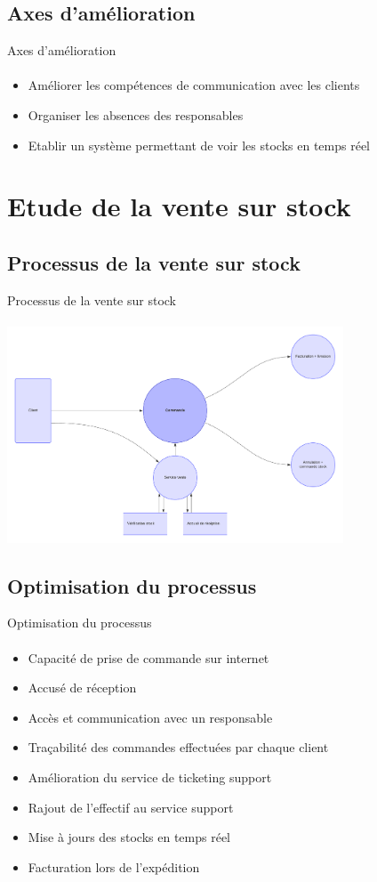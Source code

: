 \documentclass{beamer}
\begin{document}
    \subsection{Axes d'amélioration}
    \begin{frame}[label=lists]{Axes d'amélioration}
      \framesubtitle{}
      \begin{itemize}
      	\item Améliorer les compétences de communication avec les clients
      	\item Organiser les absences des responsables
      	\item Etablir un système permettant de voir les stocks en temps réel
      \end{itemize}
    \end{frame}

	\section{Etude de la vente sur stock}
	\subsection{Processus de la vente sur stock}
    \begin{frame}[label=lists]{Processus de la vente sur stock}
      \framesubtitle{}
      \includegraphics[width=100mm]{resources/flow}
    \end{frame}
    
    \subsection{Optimisation du processus}
    \begin{frame}[label=lists]{Optimisation du processus}
      \framesubtitle{}
      \begin{itemize}
		\item Capacité de prise de commande sur internet
		\item Accusé de réception
		\item Accès et communication avec un responsable
		\item Traçabilité des commandes effectuées par chaque client
		\item Amélioration du service de ticketing support
		\item Rajout de l’effectif au service support
		\item Mise à jours des stocks en temps réel
		\item Facturation lors de l’expédition
      \end{itemize}
    \end{frame}
\end{document}
